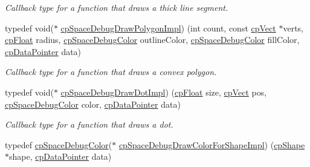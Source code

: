 \begin{DoxyCompactItemize}
\begin{DoxyCompactList}\small\item\em Callback type for a function that draws a thick line segment. \end{DoxyCompactList}\item 
\mbox{\label{group__cp_space_ga2138e846816a1e581a3433740a596ab6}} 
typedef void($\ast$ \mbox{\hyperlink{group__cp_space_ga2138e846816a1e581a3433740a596ab6}{cp\+Space\+Debug\+Draw\+Polygon\+Impl}}) (int count, const \mbox{\hyperlink{structcp_vect}{cp\+Vect}} $\ast$verts, \mbox{\hyperlink{group__basic_types_gac1ed65573e035bf892505768c852d8d3}{cp\+Float}} radius, \mbox{\hyperlink{structcp_space_debug_color}{cp\+Space\+Debug\+Color}} outline\+Color, \mbox{\hyperlink{structcp_space_debug_color}{cp\+Space\+Debug\+Color}} fill\+Color, \mbox{\hyperlink{group__basic_types_ga2ac2c3c31e21893941f9e4f8ee279447}{cp\+Data\+Pointer}} data)
\begin{DoxyCompactList}\small\item\em Callback type for a function that draws a convex polygon. \end{DoxyCompactList}\item 
\mbox{\label{group__cp_space_gadf9a758a2f1c3b53551829573b722e5a}} 
typedef void($\ast$ \mbox{\hyperlink{group__cp_space_gadf9a758a2f1c3b53551829573b722e5a}{cp\+Space\+Debug\+Draw\+Dot\+Impl}}) (\mbox{\hyperlink{group__basic_types_gac1ed65573e035bf892505768c852d8d3}{cp\+Float}} size, \mbox{\hyperlink{structcp_vect}{cp\+Vect}} pos, \mbox{\hyperlink{structcp_space_debug_color}{cp\+Space\+Debug\+Color}} color, \mbox{\hyperlink{group__basic_types_ga2ac2c3c31e21893941f9e4f8ee279447}{cp\+Data\+Pointer}} data)
\begin{DoxyCompactList}\small\item\em Callback type for a function that draws a dot. \end{DoxyCompactList}\item 
\mbox{\label{group__cp_space_gaba1fec950f2b58c7c72ab5ca553bdf43}} 
typedef \mbox{\hyperlink{structcp_space_debug_color}{cp\+Space\+Debug\+Color}}($\ast$ \mbox{\hyperlink{group__cp_space_gaba1fec950f2b58c7c72ab5ca553bdf43}{cp\+Space\+Debug\+Draw\+Color\+For\+Shape\+Impl}}) (\mbox{\hyperlink{structcp_shape}{cp\+Shape}} $\ast$shape, \mbox{\hyperlink{group__basic_types_ga2ac2c3c31e21893941f9e4f8ee279447}{cp\+Data\+Pointer}} data)

\end{DoxyCompactItemize}
